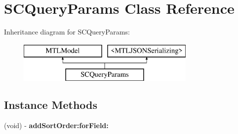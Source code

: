 \hypertarget{interface_s_c_query_params}{}\section{S\+C\+Query\+Params Class Reference}
\label{interface_s_c_query_params}
Inheritance diagram for S\+C\+Query\+Params\+:\begin{figure}[H]
\begin{center}
\leavevmode
\includegraphics[height=2.000000cm]{interface_s_c_query_params}
\end{center}
\end{figure}
\subsection*{Instance Methods}
\begin{DoxyCompactItemize}
\item 
(void) -\/ {\bfseries add\+Sort\+Order\+:for\+Field\+:}\hypertarget{interface_s_c_query_params_a81c86eda9eeb3bb3d90e835b2b424568}{}\label{interface_s_c_query_params_a81c86eda9eeb3bb3d90e835b2b424568}

\end{DoxyCompactItemize}
